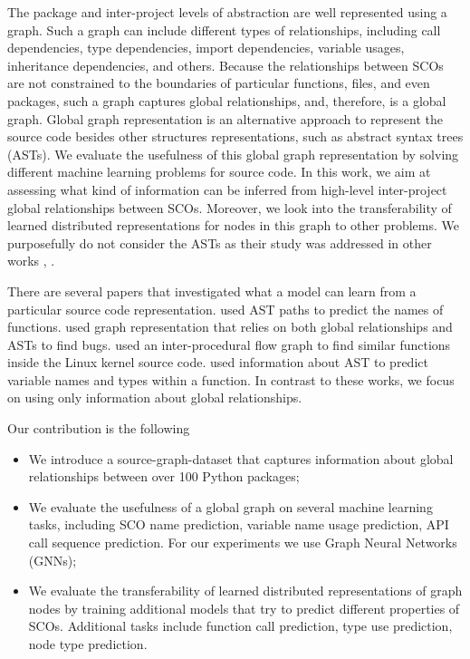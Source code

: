 \documentclass[a4paper,twoside]{article}
\begin{document}
The package and inter-project levels of abstraction are well represented using a graph. Such a graph can include different types of relationships, including call dependencies, type dependencies, import dependencies, variable usages, inheritance dependencies, and others. Because the relationships between SCOs are not constrained to the boundaries of particular functions, files, and even packages, such a graph captures global relationships, and, therefore, is a global graph. Global graph representation is an alternative approach to represent the source code besides other structures representations, such as abstract syntax trees (ASTs). We evaluate the usefulness of this global graph representation by solving different machine learning problems for source code. In this work, we aim at assessing what kind of information can be inferred from high-level inter-project global relationships between SCOs. Moreover, we look into the transferability of learned distributed representations for nodes in this graph to other problems. We purposefully do not consider the ASTs as their study was addressed in other works \cite{Alon2018}, \cite{Yahav2018}.

There are several papers that investigated what a model can learn from a particular source code representation. \cite{Alon2018a} used AST paths to predict the names of functions. \cite{Allamanis2017} used graph representation that relies on both global relationships and ASTs to find bugs. \cite{DeFreez2018} used an inter-procedural flow graph to find similar functions inside the Linux kernel source code. \cite{Raychev2015} used information about AST to predict variable names and types within a function. In contrast to these works, we focus on using only information about global relationships. 

Our contribution is the following
\begin{itemize}
    \item We introduce a source-graph-dataset that captures information about global relationships between over 100 Python packages;
    \item We evaluate the usefulness of a global graph on several machine learning tasks, including SCO name prediction, variable name usage prediction, API call sequence prediction. For our experiments we use Graph Neural Networks (GNNs);
    \item We evaluate the transferability of learned distributed representations of graph nodes by training additional models that try to predict different properties of SCOs. Additional tasks include function call prediction, type use prediction, node type prediction.
\end{itemize}
\end{document}
